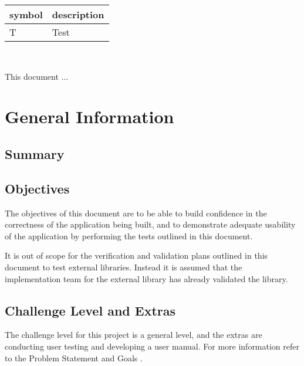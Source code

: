 \documentclass[12pt, titlepage]{article}
\begin{document}
\renewcommand{\arraystretch}{1.2}
\begin{tabular}{l l}
  \toprule
  \textbf{symbol} & \textbf{description}\\
  \midrule
  T & Test\\
  \bottomrule
\end{tabular}\\



\newpage


This document ... 

\section{General Information}

\subsection{Summary}


\subsection{Objectives}

The objectives of this document are to be able to build confidence in
the correctness of the application being built, and to demonstrate
adequate usability of the application by performing the tests
outlined in this document.

It is out of scope for the verification and validation plans outlined
in this document to test external libraries. Instead it is assumed
that the implementation team for the external library has already
validated the library.

\subsection{Challenge Level and Extras}

The challenge level for this project is a general level, and the
extras are conducting user testing and developing a user manual. For
more information refer to the Problem Statement and Goals
\citep[\textit{Challenge Level and Extras}]{ProblemStatement}.
\end{document}
